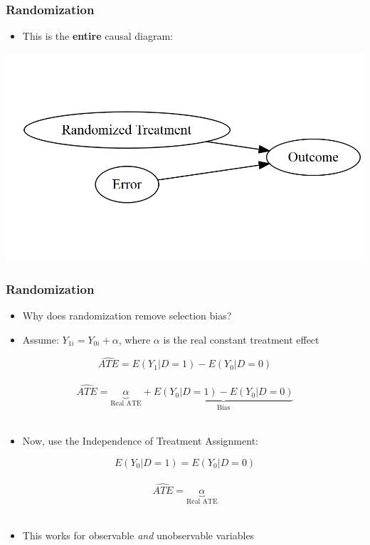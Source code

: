 \documentclass[xcolor=x11names,compress]{beamer}\usepackage[]{graphicx}\usepackage[]{color}
\makeatletter
\def\maxwidth{ %
  \ifdim\Gin@nat@width>\linewidth
    \linewidth
  \else
    \Gin@nat@width
  \fi
}
\newenvironment{knitrout}{}{} %
\renewcommand{\(}{\begin{columns}}
\renewcommand{\)}{\end{columns}}
\newcommand{\<}[1]{\begin{column}{#1}}
\renewcommand{\>}{\end{column}}
\makeatother
\begin{document}
\begin{frame}
\frametitle{Randomization}
\begin{itemize}
\item This is the \textbf{entire} causal diagram:
\end{itemize}
\pause
\begin{knitrout}
\color{fgcolor}
\includegraphics[width=\maxwidth]{figure/explanation1-1} 

\end{knitrout}
\end{frame}

\begin{frame}
\frametitle{Randomization}
\begin{itemize}
\item Why does randomization remove selection bias?
\pause
\item Assume: $Y_{1i} = Y_{0i} + \alpha$, where $\alpha$ is the real constant treatment effect
\pause
\end{itemize}
$$ \hat{ATE} = E(Y_1|D=1) - E(Y_0|D=0)$$ \\ \pause
$$ \hat{ATE} = \underbrace{\alpha}_\text{Real ATE} + \underbrace{E(Y_0|D=1) - E(Y_0|D=0)}_\text{Bias}$$ \\
\pause
\begin{itemize}
\item Now, use the Independence of Treatment Assignment:
\end{itemize}
$$ E(Y_0|D=1) = E(Y_0|D=0)$$ \\ \pause
$$ \hat{ATE} = \underbrace{\alpha}_\text{Real ATE} $$ \\
\pause
\begin{itemize}
\item This works for observable \textit{and} unobservable variables
\end{itemize}
\end{frame}
\end{document}
